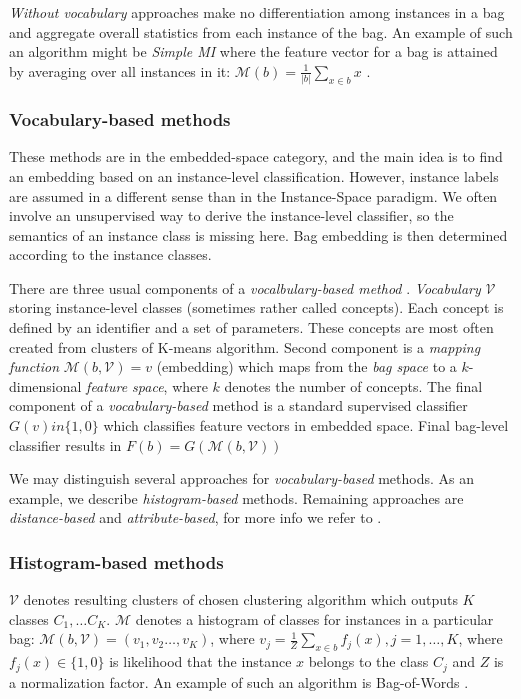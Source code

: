 \emph{Without vocabulary} approaches make no differentiation among instances in a bag and aggregate overall statistics from each instance of the bag. An example of such an algorithm might be \emph{Simple MI} where the feature vector for a bag is attained by averaging over all instances in it: $\mathcal{M}(b)=\frac{1}{|b|}\sum_{x\in b}x$ \cite{Dong2006}.

\subsubsection{Vocabulary-based methods}
These methods are in the embedded-space category, and the main idea is to find an embedding based on an instance-level classification. However, instance labels are assumed in a different sense than in the Instance-Space paradigm. We often involve an unsupervised way to derive the instance-level classifier, so the semantics of an instance class is missing here. Bag embedding is then determined according to the instance classes.

There are three usual components of a \emph{vocalbulary-based method} \cite{Amores2013}. \emph{Vocabulary} $\mathcal{V}$ storing instance-level classes (sometimes rather called concepts). Each concept is defined by an identifier and a set of parameters. These concepts are most often created from clusters of K-means algorithm. Second component is a \emph{mapping function} $\mathcal{M}(b, \mathcal{V})=v$ (embedding) which maps from the \emph{bag space} to  a $k$-dimensional \emph{feature space}, where $k$ denotes the number of concepts. The final component of a \emph{vocabulary-based} method is a standard supervised classifier $G(v) in \{1,0\}$ which classifies feature vectors in embedded space. Final bag-level classifier results in $F(b)=G(\mathcal{M}(b,\mathcal{V}))$

We may distinguish several approaches for \emph{vocabulary-based} methods. As an example, we describe \emph{histogram-based} methods. Remaining approaches are \emph{distance-based} and \emph{attribute-based}, for more info we refer to \cite{Amores2013}.

\subsubsection{Histogram-based methods}
$\mathcal{V}$ denotes resulting clusters of chosen clustering algorithm which outputs $K$ classes $C_1,\dots C_K$. $\mathcal{M}$ denotes a histogram of classes for instances in a particular bag: $\mathcal{M}(b,\mathcal{V})=(v_1,v_2\dots,v_K)$, where $v_j=\frac{1}{Z}\sum_{x\in b}f_{j}(x), j=1,\dots,K$, where $f_{j}(x) \in \{1,0\}$ is likelihood that the instance $x$ belongs to the class $C_j$ and $Z$ is a normalization factor. An example of such an algorithm is Bag-of-Words \cite{Nowak2006}.

